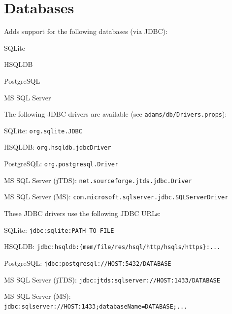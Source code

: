 \documentclass[a4paper]{book}
\begin{document}
\chapter{Databases}
Adds support for the following databases (via JDBC):
\begin{tight_itemize}
  \item SQLite\cite{sqlite}
  \item HSQLDB\cite{hsqldb}
  \item PostgreSQL\cite{postgresql}
  \item MS SQL Server\cite{mssql}
\end{tight_itemize}
The following JDBC drivers are available (see \texttt{adams/db/Drivers.props}):
\begin{tight_itemize}
  \item SQLite: \verb|org.sqlite.JDBC|
  \item HSQLDB: \verb|org.hsqldb.jdbcDriver|
  \item PostgreSQL: \verb|org.postgresql.Driver|
  \item MS SQL Server (jTDS)\cite{jtds}: \verb|net.sourceforge.jtds.jdbc.Driver|
  \item MS SQL Server (MS)\cite{mssqljdbc}: \verb|com.microsoft.sqlserver.jdbc.SQLServerDriver|
\end{tight_itemize}
These JDBC drivers use the following JDBC URLs:
\begin{tight_itemize}
  \item SQLite\cite{sqlitexerial}: \verb|jdbc:sqlite:PATH_TO_FILE|
  \item HSQLDB: \verb|jdbc:hsqldb:{mem/file/res/hsql/http/hsqls/https}:...|
  \item PostgreSQL: \verb|jdbc:postgresql://HOST:5432/DATABASE|
  \item MS SQL Server (jTDS): \verb|jdbc:jtds:sqlserver://HOST:1433/DATABASE|
  \item MS SQL Server (MS): \verb|jdbc:sqlserver://HOST:1433;databaseName=DATABASE;...|
\end{tight_itemize}



\end{document}
